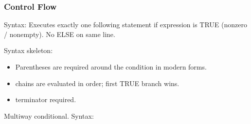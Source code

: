 \documentclass[letterpaper,10pt,english]{sphinxmanual}
\begin{document}
\subsubsection{Control Flow}
\label{\detokenize{ppl:control-flow}}\begin{description}
\sphinxAtStartPar
Syntax: 
Executes exactly one following statement if expression is TRUE (non\sphinxhyphen{}zero / non\sphinxhyphen{}empty). No ELSE on same line.

\sphinxAtStartPar
Syntax skeleton:

\begin{sphinxVerbatim}[commandchars=\\\{\}]
    
\PYG{p}{[}    
    \PYG{p}{]}
\PYG{p}{[}
    \PYG{p}{]}
\end{sphinxVerbatim}
\begin{description}
\begin{itemize}
\item {} 
\sphinxAtStartPar
Parentheses are required around the condition in modern forms.

\item {} 
\sphinxAtStartPar
{} chains are evaluated in order; first TRUE branch wins.

\item {} 
\sphinxAtStartPar
{} terminator required.

\end{itemize}

\end{description}

\sphinxAtStartPar
Multi\sphinxhyphen{}way conditional.
Syntax:


\end{description}
\end{document}
